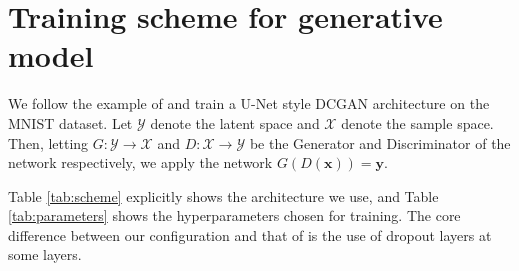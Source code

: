 \documentclass{article}
\theoremstyle{plain}
\theoremstyle{definition}
\theoremstyle{remark}
\newcommand{\vx}{\mathbf{x}}
\newcommand{\vy}{\mathbf{y}}
\begin{document}
\section{Training scheme for generative model}
\label{app:gen-training-scheme}
We follow the example of \citealt{shocher-ign} and train a U-Net style DCGAN architecture on the MNIST dataset. Let $\mathcal{Y}$ denote the latent space and $\mathcal{X}$ denote the sample space. Then, letting ${G: \mathcal{Y} \to \mathcal{X}}$ and ${D: \mathcal{X} \to \mathcal{Y}}$ be the Generator and Discriminator of the network respectively, we apply the network $G(D(\vx)) = \vy$.

Table \ref{tab:scheme} explicitly shows the architecture we use, and Table \ref{tab:parameters} shows the hyperparameters chosen for training. The core difference between our configuration and that of \citealt{shocher-ign} is the use of dropout layers at some layers.
\end{document}
